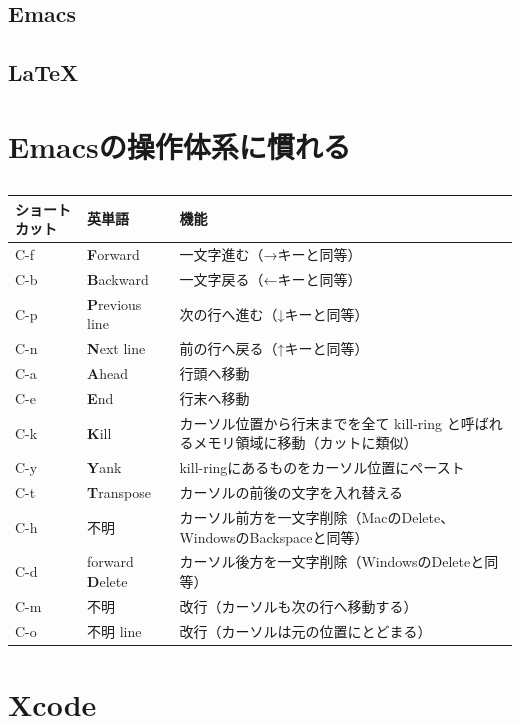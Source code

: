 \subsection{Emacs}
\subsection{\LaTeX}

\section{Emacsの操作体系に慣れる}

\begin{table}
\begin{center}
\caption{}
\label{tab_emacs}
\begin{tabular}{lll}
\hline
ショートカット & 英単語 & 機能 \\ \hline\hline
C-f & {\bf F}orward & 一文字進む（→キーと同等） \\
C-b & {\bf B}ackward & 一文字戻る（←キーと同等） \\
C-p & {\bf P}revious line & 次の行へ進む（↓キーと同等） \\
C-n & {\bf N}ext line & 前の行へ戻る（↑キーと同等） \\
C-a & {\bf A}head & 行頭へ移動 \\
C-e & {\bf E}nd & 行末へ移動 \\
C-k & {\bf K}ill & カーソル位置から行末までを全て kill-ring と呼ばれるメモリ領域に移動（カットに類似） \\
C-y & {\bf Y}ank & kill-ringにあるものをカーソル位置にペースト \\
C-t & {\bf T}ranspose & カーソルの前後の文字を入れ替える \\
C-h & 不明 & カーソル前方を一文字削除（MacのDelete、WindowsのBackspaceと同等） \\
C-d & forward {\bf D}elete & カーソル後方を一文字削除（WindowsのDeleteと同等） \\
C-m & 不明 & 改行（カーソルも次の行へ移動する） \\
C-o & 不明 line & 改行（カーソルは元の位置にとどまる） \\ \hline
\end{tabular}
\end{center}
\end{table}


\section{Xcode}